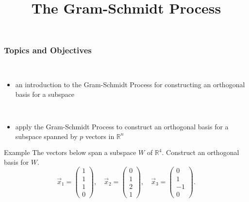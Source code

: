 \title{The Gram-Schmidt Process}
\subtitle{\SubTitleName}
\institute[]{\Course}
\author{\Instructor}
\maketitle   
  


\begin{frame}\frametitle{Topics and Objectives}
     \\
    \begin{itemize}
        \item an introduction to the Gram-Schmidt Process for constructing an orthogonal basis for a subspace
    \end{itemize}
    
    \vspace{0.5cm}
    
    \\
    
    
    \begin{itemize}
    \item  apply the Gram-Schmidt Process to construct an orthogonal basis for a subspace spanned by $p$ vectors in $\mathbb R^n$
    
      
    \end{itemize}
    
    \vspace{0.25cm} 
 
\end{frame}






\begin{frame}{Example}
    The vectors below span a subspace $W$ of $\mathbb R^{4}$. Construct an orthogonal basis for $W$. 
    \begin{equation*}
        \vec x_1 = \begin{pmatrix}
        1 \\ 1\\ 1\\ 0 
        \end{pmatrix}, \quad 
        \vec x_2 = \begin{pmatrix}
        0 \\ 1\\ 2 \\ 1 
        \end{pmatrix}, \quad 
        \vec x_3 = \begin{pmatrix}
        0 \\ 1 \\ -1 \\ 0 
    \end{pmatrix}. 
    \end{equation*}


\end{frame}

